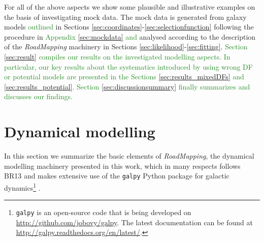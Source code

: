 \documentclass[iop,revtex4]{emulateapj}
\newcommand{\RM}{{\sl RoadMapping}}
\newcommand{\NEW}[1]{\textcolor{ForestGreen}{#1}}
\newcommand{\OLD}[1]{}
\begin{document}
For all of the above aspects we show some plausible and illustrative examples on the basis of investigating mock data. The mock data is generated from galaxy models \OLD{presented}\NEW{outlined} in Sections \ref{sec:coordinates}-\ref{sec:selectionfunction} following the procedure in \OLD{Section}\NEW{Appendix} \ref{sec:mockdata}\OLD{, }\NEW{ and }analysed according to the description of the \RM{} machinery in Sections \ref{sec:likelihood}-\ref{sec:fitting}. \OLD{The results on the investigated modelling aspects are presented in Section \ref{sec:results} and summarized and discussed in Section \ref{sec:discussionsummary}.}\NEW{Section \ref{sec:result} compiles our results on the investigated modelling aspects. In particular, our key results about the systematics introduced by using wrong DF or potential models are presented in the Sections \ref{sec:results_mixedDFs} and \ref{sec:results_potential}. Section \ref{sec:discussionsummary} finally summarizes and discusses our findings.}



\section{Dynamical modelling}

In this section we summarize the basic elements of \RM{}, the dynamical modelling machinery presented in this work, which in many respects follows BR13 and makes extensive use of the \texttt{galpy} Python package for galactic dynamics\footnote{\texttt{galpy} is an open-source code that is being developed on \url{http://github.com/jobovy/galpy}. The latest documentation can be found at \url{http://galpy.readthedocs.org/en/latest/}.} \citep{2015ApJS..216...29B}.

\end{document}
